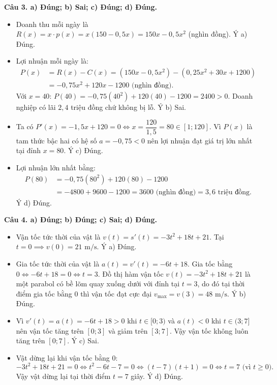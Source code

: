 \documentclass[12pt,a4paper]{article}
\newcommand{\loigiai}[1]{\par\medskip\Needspace{4\baselineskip}\noindent\textbf{#1}\par\nobreak}
\begin{document}
\loigiai{Câu 3. a) Đúng; b) Sai; c) Đúng; d) Đúng.}
\begin{itemize}
\item[a)] Doanh thu mỗi ngày là $R(x) = x \cdot p(x) = x(150 - 0{,}5x) = 150x - 0{,}5x^2$ (nghìn đồng). Ý a) Đúng.
\item[b)] Lợi nhuận mỗi ngày là:
\begin{align*}
P(x) &= R(x) - C(x) = (150x - 0{,}5x^2) - (0{,}25x^2 + 30x + 1200) \\
&= -0{,}75x^2 + 120x - 1200\text{ (nghìn đồng)}.
\end{align*}
Với $x = 40$: $P(40) = -0{,}75(40^2) + 120(40) - 1200 = 2400 > 0$. Doanh nghiệp có lãi $2{,}4$ triệu đồng chứ không bị lỗ. Ý b) Sai.
\item[c)] Ta có $P'(x) = -1{,}5x + 120 = 0 \iff x = \dfrac{120}{1{,}5} = 80 \in [1; 120]$. Vì $P(x)$ là tam thức bậc hai có hệ số $a = -0{,}75 < 0$ nên lợi nhuận đạt giá trị lớn nhất tại đỉnh $x = 80$. Ý c) Đúng.
\item[d)] Lợi nhuận lớn nhất bằng:
\begin{align*}
P(80) &= -0{,}75(80^2) + 120(80) - 1200 \\
&= -4800 + 9600 - 1200 = 3600\text{ (nghìn đồng)} = 3{,}6\text{ triệu đồng}.
\end{align*}
Ý d) Đúng.
\end{itemize}

\loigiai{Câu 4. a) Đúng; b) Đúng; c) Sai; d) Đúng.}
\begin{itemize}
\item[a)] Vận tốc tức thời của vật là $v(t) = s'(t) = -3t^2 + 18t + 21$. Tại $t = 0 \implies v(0) = 21\text{ m/s}$. Ý a) Đúng.
\item[b)] Gia tốc tức thời của vật là $a(t) = v'(t) = -6t + 18$. Gia tốc bằng $0 \iff -6t + 18 = 0 \iff t = 3$. Đồ thị hàm vận tốc $v(t) = -3t^2 + 18t + 21$ là một parabol có bề lõm quay xuống dưới với đỉnh tại $t = 3$, do đó tại thời điểm gia tốc bằng $0$ thì vận tốc đạt cực đại $v_{\max} = v(3) = 48\text{ m/s}$. Ý b) Đúng.
\item[c)] Vì $v'(t) = a(t) = -6t + 18 > 0$ khi $t \in [0; 3)$ và $a(t) < 0$ khi $t \in (3; 7]$ nên vận tốc tăng trên $[0; 3]$ và giảm trên $[3; 7]$. Vậy vận tốc không luôn tăng trên $[0; 7]$. Ý c) Sai.
\item[d)] Vật dừng lại khi vận tốc bằng $0$:
\[-3t^2 + 18t + 21 = 0 \iff t^2 - 6t - 7 = 0 \iff (t - 7)(t + 1) = 0 \iff t = 7\text{ (vì } t \ge 0\text{)}.\]
Vậy vật dừng lại tại thời điểm $t = 7$ giây. Ý d) Đúng.
\end{itemize}
\end{document}

